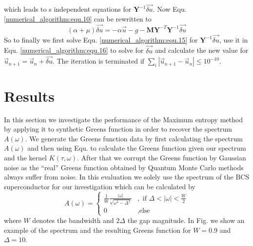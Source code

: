 \documentclass[10pt,letterpaper]{article}
\begin{document}
which leads to s independent equations for $\mathbf{Y}^{-1} \vec{\delta u}$.
Now Equ. \ref{numerical_algorithm:equ.10} can be rewritten to
\begin{equation}
	(\alpha + \mu)\vec{\delta u} = -\alpha \vec u - g - \mathbf{M}\mathbf{Y}^{-T}\mathbf{Y}^{-1} \vec{\delta u}
	\label{numerical_algorithm:equ.16}
\end{equation}
So to finally we first solve Equ. \ref{numerical_algorithm:equ.15} for $\mathbf{Y}^{-1} \vec{\delta u}$, use it in Equ. \ref{numerical_algorithm:equ.16} to solve for $\vec{\delta u}$ and calculate the new value for $\vec u_{n+1} = \vec u_{n} + \vec{\delta u}$. The iteration is terminated if $\sum_i |\vec u_{n+1} - \vec u_{n}| \leq 10^{-10}$.
\section{Results} %
\label{sec:results}
In this section we investigate the performance of the Maximum entropy method by applying it to synthetic Greens function in order to recover the spectrum $A(\omega)$. We generate the Greens function data by first calculating the spectrum $A(\omega)$ and then using Equ. to calculate the Greens function given our spectrum and the kernel $K(\tau,\omega)$. After that we corrupt the Greens function by Gaussian noise as the ``real'' Greens function obtained by Quantum Monte Carlo methods always suffer from noise. In this evaluation we solely use the spectrum of the BCS superconductor for our investigation which can be calculated by 
\begin{equation}
	A(\omega) = 
		\begin{cases}
			\frac{1}{W} \frac{|\omega|}{\sqrt{\omega^2 - \Delta^2}}&, \text{ if } \Delta < |\omega| < \frac{W}{2} \\
			0 &, \text{else}
		\end{cases}
	\label{results:equ.1}
\end{equation}
where $W$ denotes the bandwidth and $2\Delta$ the gap magnitude.
In Fig. we show an example of the spectrum and the resulting Greens function for $W = 0.9$ and $\Delta = 10$.
\end{document}
